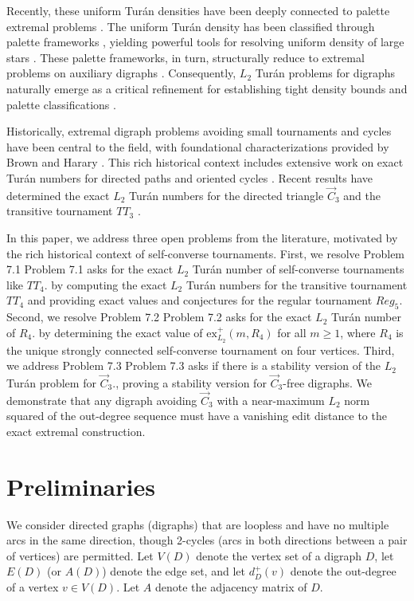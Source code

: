 \documentclass[a4paper]{amsart}
\begin{document}
Recently, these uniform Tur\'an densities have been deeply connected to palette extremal problems \cite{lamaison2024palettes}.
The uniform Tur\'an density has been classified through palette frameworks \cite{kral2025uniform}, yielding powerful tools for resolving uniform density of large stars \cite{lamaison2024uniform}.
These palette frameworks, in turn, structurally reduce to extremal problems on auxiliary digraphs \cite{lin2026extremal}.
Consequently, $L_2$ Tur\'an problems for digraphs naturally emerge as a critical refinement for establishing tight density bounds and palette classifications \cite{ai2026finite}.

Historically, extremal digraph problems avoiding small tournaments and cycles have been central to the field, with foundational characterizations provided by Brown and Harary \cite{brown1970extremal}.
This rich historical context includes extensive work on exact Tur\'an numbers for directed paths and oriented cycles \cite{zhou2023turan}.
Recent results have determined the exact $L_2$ Tur\'an numbers for the directed triangle $\vec{C}_3$ and the transitive tournament $TT_3$ \cite{ai2026finite}.

In this paper, we address three open problems from the literature, motivated by the rich historical context of self-converse tournaments.
First, we resolve Problem 7.1 Problem 7.1 asks for the exact $L_2$ Tur\'an number of self-converse tournaments like $TT_4$. by computing the exact $L_2$ Tur\'an numbers for the transitive tournament $TT_4$ and providing exact values and conjectures for the regular tournament $Reg_5$.
Second, we resolve Problem 7.2 Problem 7.2 asks for the exact $L_2$ Tur\'an number of $R_4$. by determining the exact value of $\text{ex}^+_{L_2}(m, R_4)$ for all $m \ge 1$, where $R_4$ is the unique strongly connected self-converse tournament on four vertices.
Third, we address Problem 7.3 Problem 7.3 asks if there is a stability version of the $L_2$ Tur\'an problem for $\vec{C}_3$., proving a stability version for $\vec{C}_3$-free digraphs.
We demonstrate that any digraph avoiding $\vec{C}_3$ with a near-maximum $L_2$ norm squared of the out-degree sequence must have a vanishing edit distance to the exact extremal construction.

\section{Preliminaries}

We consider directed graphs (digraphs) that are loopless and have no multiple arcs in the same direction, though 2-cycles (arcs in both directions between a pair of vertices) are permitted.
Let $V(D)$ denote the vertex set of a digraph $D$, let $E(D)$ (or $A(D)$) denote the edge set, and let $d^+_D(v)$ denote the out-degree of a vertex $v \in V(D)$.
Let $A$ denote the adjacency matrix of $D$.
\end{document}
